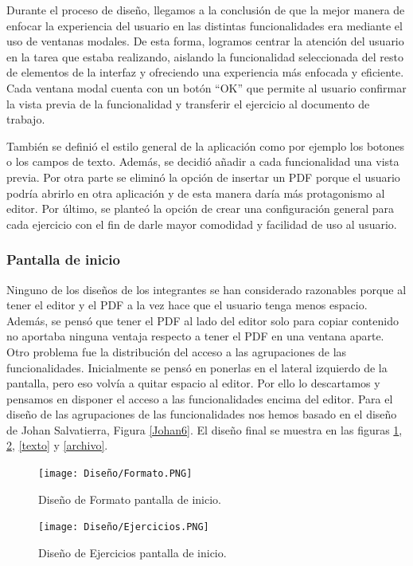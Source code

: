 Durante el proceso de diseño, llegamos a la conclusión de que la mejor manera de enfocar la experiencia del usuario en las distintas funcionalidades era mediante el uso de ventanas modales. De esta forma, logramos centrar la atención del usuario en la tarea que estaba realizando, aislando la funcionalidad seleccionada del resto de elementos de la interfaz y ofreciendo una experiencia más enfocada y eficiente. Cada ventana modal cuenta con un botón ``OK'' que permite al usuario confirmar la vista previa de la funcionalidad y transferir el ejercicio al documento de trabajo.

También se definió el estilo general de la aplicación como por ejemplo los botones o los campos de texto. Además, se decidió añadir a cada funcionalidad una vista previa. Por otra parte se eliminó la opción de insertar un PDF porque el usuario podría abrirlo en otra aplicación y de esta manera daría más protagonismo al editor. Por último, se planteó la opción de crear una configuración general para cada ejercicio con el fin de darle mayor comodidad y facilidad de uso al usuario.

\subsubsection{Pantalla de inicio}
Ninguno de los diseños de los integrantes se han considerado razonables porque al tener el editor y el PDF a la vez hace que el usuario tenga menos espacio. Además, se pensó que tener el PDF al lado del editor solo para copiar contenido no aportaba ninguna ventaja respecto a tener el PDF en una ventana aparte. Otro problema fue la distribución del acceso a las agrupaciones de las funcionalidades. Inicialmente se pensó en ponerlas en el lateral izquierdo de la pantalla, pero eso volvía a quitar espacio al editor. Por ello lo descartamos y pensamos en disponer el acceso a las funcionalidades encima del editor. Para el diseño de las agrupaciones de las funcionalidades nos hemos basado en el diseño de Johan Salvatierra, Figura \ref{Johan6}. El diseño final se muestra en las figuras \ref{Forato}, \ref{ejercicios}, \ref{texto} y \ref{archivo}.

\begin{figure}[ht!]
  \centering
  \texttt{[image: Diseño/Formato.PNG]}
  \caption{Diseño de Formato pantalla de inicio.}
  \label{Forato}
\end{figure}

\begin{figure}[ht!]
  \centering
  \texttt{[image: Diseño/Ejercicios.PNG]}
  \caption{Diseño de Ejercicios pantalla de inicio.}
  \label{ejercicios}
\end{figure}

